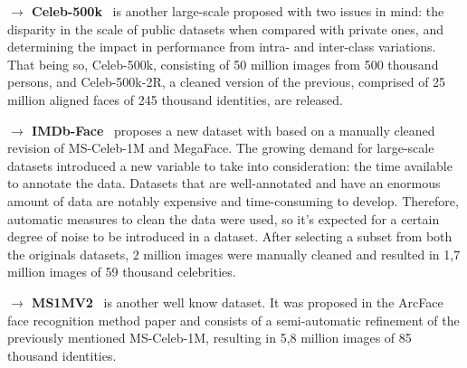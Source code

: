 \documentclass[class=report, crop=false, a4paper, 12pt]{standalone}
\begin{document}


\vspace{0.7\baselineskip}
\noindent\textbf{$\rightarrow$ Celeb-500k}~\autocite{caoCeleb500KLargeTraining2018} is another large-scale proposed with two issues in mind: the disparity in the scale of public datasets when compared with private ones, and determining the impact in performance from intra- and inter-class variations. That being so, Celeb-500k, consisting of 50 million images from 500 thousand persons, and Celeb-500k-2R, a cleaned version of the previous, comprised of 25 million aligned faces of 245 thousand identities, are released.

\vspace{0.7\baselineskip}
\noindent\textbf{$\rightarrow$ IMDb-Face}~\autocite{wangDevilFaceRecognition2018} proposes a new dataset with based on a manually cleaned revision of MS-Celeb-1M and MegaFace. The growing demand for large-scale datasets introduced a new variable to take into consideration: the time available to annotate the data. Datasets that are well-annotated and have an enormous amount of data are notably expensive and time-consuming to develop. Therefore, automatic measures to clean the data were used, so it's expected for a certain degree of noise to be introduced in a dataset. After selecting a subset from both the originals datasets, 2 million images were manually cleaned and resulted in 1,7 million images of 59 thousand celebrities.

\vspace{0.7\baselineskip}
\noindent\textbf{$\rightarrow$ MS1MV2}~\autocite{dengArcFaceAdditiveAngular} is another well know dataset. It was proposed in the ArcFace face recognition method paper and consists of a semi-automatic refinement of the previously mentioned MS-Celeb-1M, resulting in 5,8 million images of 85 thousand identities.
\end{document}
